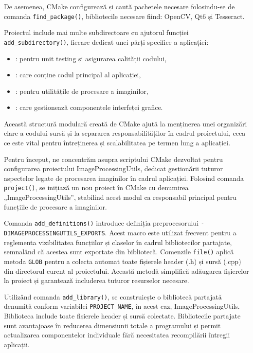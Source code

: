 \documentclass[a4paper,12pt]{report}
\begin{document}
De asemenea, CMake configurează și caută pachetele necesare folosindu-se de comanda \texttt{find\_package()}, bibliotecile necesare fiind: OpenCV, Qt6 și Tesseract.

Proiectul include mai multe subdirectoare cu ajutorul funcției \texttt{add\_subdirectory()}, fiecare dedicat unei părți specifice a aplicației:
\begin{itemize}
    \item {}: pentru unit testing și asigurarea calității codului,
    \item {}: care conține codul principal al aplicației,
    \item {}: pentru utilitățile de procesare a imaginilor,
    \item {}: care gestionează componentele interfeței grafice.
\end{itemize}

Această structură modulară creată de CMake ajută la menținerea unei organizări clare a codului sursă și la separarea responsabilităților în cadrul proiectului, ceea ce este vital pentru întreținerea și scalabilitatea pe termen lung a aplicației.

Pentru început, ne concentrăm asupra scriptului CMake dezvoltat pentru configurarea proiectului ImageProcessingUtils, dedicat gestionării tuturor aspectelor legate de procesarea imaginilor în cadrul aplicației. Folosind comanda \texttt{project()}, se inițiază un nou proiect în CMake cu denumirea „ImageProcessingUtils”, stabilind acest modul ca responsabil principal pentru funcțiile de procesare a imaginilor.

Comanda \texttt{add\_definitions()} introduce definiția preprocesorului \newline \texttt{-DIMAGEPROCESSINGUTILS\_EXPORTS}. Acest macro este utilizat frecvent pentru a reglementa vizibilitatea funcțiilor și claselor în cadrul bibliotecilor partajate, semnalând că acestea sunt exportate din bibliotecă. Comenzile \texttt{file()} aplică metoda \texttt{GLOB} pentru a colecta automat toate fișierele header (.h) și sursă (.cpp) din directorul curent al proiectului. Această metodă simplifică adăugarea fișierelor la proiect și garantează includerea tuturor resurselor necesare.

Utilizând comanda \texttt{add\_library()}, se construiește o bibliotecă partajată denumită conform variabilei \texttt{PROJECT\_NAME}, în acest caz, ImageProcessingUtils. Biblioteca include toate fișierele header și sursă colectate. Bibliotecile partajate sunt avantajoase în reducerea dimensiunii totale a programului și permit actualizarea componentelor individuale fără necesitatea recompilării întregii aplicații.
\end{document}
